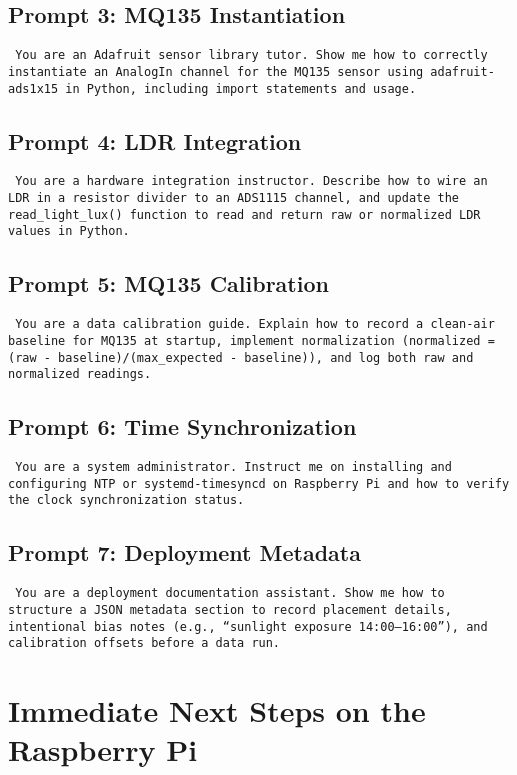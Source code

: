 \documentclass[11pt]{article}
\begin{document}
\subsection*{Prompt 3: MQ135 Instantiation}
\texttt{
You are an Adafruit sensor library tutor. Show me how to correctly instantiate an AnalogIn channel for the MQ135 sensor using adafruit-ads1x15 in Python, including import statements and usage.
 }

\subsection*{Prompt 4: LDR Integration}
\texttt{
You are a hardware integration instructor. 
Describe how to wire an LDR in a resistor divider to an ADS1115 channel, 
and update the read\_light\_lux() function to read and return raw or normalized LDR values in Python.
 }

\subsection*{Prompt 5: MQ135 Calibration}
\texttt{
You are a data calibration guide. 
Explain how to record a clean-air baseline for MQ135 at startup, 
implement normalization (normalized = (raw - baseline)/(max\_expected - baseline)), 
and log both raw and normalized readings.
}

\subsection*{Prompt 6: Time Synchronization}
\texttt{
You are a system administrator. Instruct me on installing and configuring NTP or systemd-timesyncd on Raspberry Pi and how to verify the clock synchronization status.
}

\subsection*{Prompt 7: Deployment Metadata}
\texttt{
You are a deployment documentation assistant. Show me how to structure a JSON metadata section to record placement details, intentional bias notes (e.g., “sunlight exposure 14:00–16:00”), and calibration offsets before a data run.
}


\section*{Immediate Next Steps on the Raspberry Pi}
\end{document}
